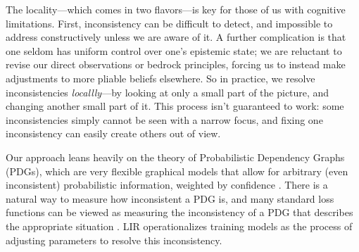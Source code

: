 \documentclass[twoside]{article}
\let\cite\citep
\theoremstyle{plain}
\theoremstyle{definition}
\theoremstyle{remark}
\begin{document}
The locality---which comes in two flavors---is key for those of us with cognitive limitations.
First, inconsistency can be difficult to detect, and 
   impossible to address constructively unless we are aware of it.
A further complication is that one seldom has uniform control over one's epistemic state; 
   we are reluctant to revise our direct observations or bedrock principles, forcing us to instead make adjustments to more pliable beliefs elsewhere.
So in practice, we resolve inconsistencies \emph{locallly}---by looking at only a small part of the picture, and changing another small part of it.
This process isn't guaranteed to work: some inconsistencies simply cannot be seen with a narrow focus, and fixing one inconsistency can easily create others out of view.




%


Our approach leans heavily on the theory of
Probabilistic Dependency Graphs (PDGs), which are very flexible graphical
   models that allow for arbitrary (even inconsistent)
   probabilistic information, weighted by confidence \cite{pdg-aaai}.
There is a natural way
   to measure how inconsistent a PDG is,
   and many standard loss functions
   can be viewed as measuring the inconsistency of a PDG that
   describes the appropriate situation \cite{one-true-loss}.
LIR operationalizes training models as
   the process of adjusting parameters to resolve this inconsistency.
\end{document}
